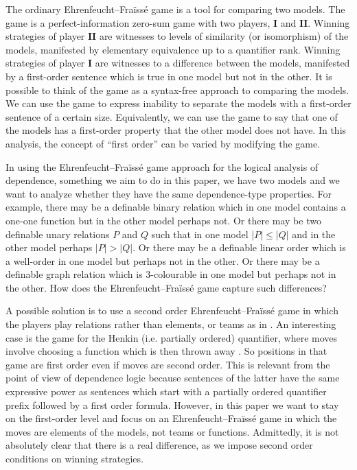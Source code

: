 \documentclass[12pt]{article}
\theoremstyle{definition}
\newcommand{\playerone}{\mathrm{\mathbf{I}}}
\newcommand{\playertwo}{\mathrm{\mathbf{II}}}
\begin{document}
The ordinary Ehrenfeucht--Fraïssé game is a tool for comparing two models. The game is a perfect-information zero-sum game with two players, $\playerone$ and $\playertwo$. Winning strategies of player $\playertwo$ are witnesses to levels of similarity (or isomorphism) of the models, manifested by elementary equivalence up to a quantifier rank. Winning strategies of player $\playerone$ are witnesses to a difference between the models, manifested by a first-order sentence which is true in one model but not in the other. It is possible to think of the game as a syntax-free approach to comparing the models. We can use the game to express inability to separate the models with a first-order sentence of a certain size. Equivalently, we can use the game to say that one of the models has a first-order property that the other model does not have. In this analysis, the concept of ``first order'' can be varied by modifying the game.

In using the Ehrenfeucht--Fraïssé game approach for the logical analysis of dependence, something we aim to do in this paper, we have two models and we want to analyze whether they have the same dependence-type properties. For example, there may be a  definable binary relation which in one model contains a one-one function but in the other model perhaps not. Or there may be two definable unary relations $P$ and $Q$ such that in one model $|P|\le |Q|$ and in the other model perhaps $|P|>|Q|$. Or there may be a definable linear order which is a well-order in one model but perhaps not in the other. Or there may be a definable graph relation which is 3-colourable in one model but perhaps not in the other. How does the Ehrenfeucht--Fraïssé game capture such differences?

A possible solution is to use a second order Ehrenfeucht--Fraïssé game in which the players play relations rather than elements, or teams as in \cite{MR2351449}. An interesting case is the game for the Henkin (i.e. partially ordered) quantifier, where moves involve choosing a function which is then thrown away \cite{MR427043}. So positions in that game are first order even if moves are second order. This is relevant from the point of view of dependence logic because sentences of the latter have the same expressive power as sentences which start with a partially ordered quantifier prefix followed by a first order formula. However, in this paper we want to stay on the first-order level and focus on an Ehrenfeucht--Fraïssé game in which the moves are elements of the models, not teams or functions. Admittedly, it is not absolutely clear that there is a real difference, as we impose second order conditions on winning strategies.
\end{document}
